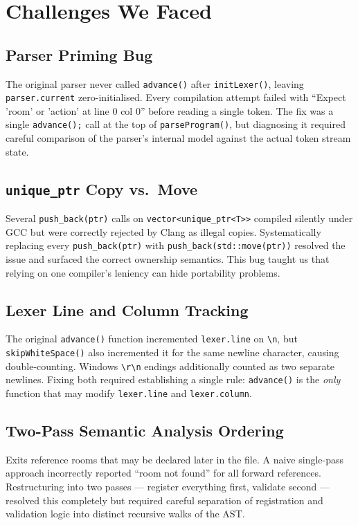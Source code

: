 \documentclass[12pt, a4paper]{article}
\begin{document}
\section{Challenges We Faced}

\subsection{Parser Priming Bug}
The original parser never called \texttt{advance()} after \texttt{initLexer()}, leaving
\texttt{parser.current} zero-initialised.
Every compilation attempt failed with ``Expect 'room' or 'action' at line 0 col 0''
before reading a single token.
The fix was a single \texttt{advance();} call at the top of \texttt{parseProgram()},
but diagnosing it required careful comparison of the parser's internal model against the
actual token stream state.

\subsection{\texttt{unique\_ptr} Copy vs.\ Move}
Several \texttt{push\_back(ptr)} calls on \texttt{vector\textless unique\_ptr\textless T\textgreater\textgreater}
compiled silently under GCC but were correctly rejected by Clang as illegal copies.
Systematically replacing every \texttt{push\_back(ptr)} with
\texttt{push\_back(std::move(ptr))} resolved the issue and surfaced the correct ownership
semantics.
This bug taught us that relying on one compiler's leniency can hide portability problems.

\subsection{Lexer Line and Column Tracking}
The original \texttt{advance()} function incremented \texttt{lexer.line} on
\texttt{\textbackslash n}, but \texttt{skipWhiteSpace()} also incremented it for the same
newline character, causing double-counting.
Windows \texttt{\textbackslash r\textbackslash n} endings additionally counted as two
separate newlines.
Fixing both required establishing a single rule: \texttt{advance()} is the \emph{only}
function that may modify \texttt{lexer.line} and \texttt{lexer.column}.

\subsection{Two-Pass Semantic Analysis Ordering}
Exits reference rooms that may be declared later in the file.
A naive single-pass approach incorrectly reported ``room not found'' for all forward
references.
Restructuring into two passes --- register everything first, validate second --- resolved
this completely but required careful separation of registration and validation logic into
distinct recursive walks of the AST.
\end{document}
